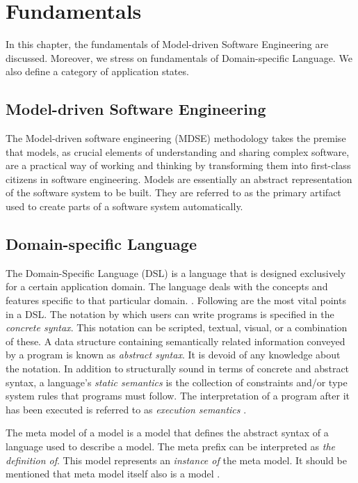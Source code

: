 \chapter{Fundamentals}
\label{ch:fundamentals}
In this chapter, the fundamentals of Model-driven Software Engineering are discussed. Moreover, we stress on fundamentals of Domain-specific Language. We also define a category of application states.

\section{Model-driven Software Engineering}
The Model-driven software engineering (MDSE) methodology takes the premise that models, as crucial elements of understanding and sharing complex software, are a practical way of working and thinking by transforming them into first-class citizens in software engineering\cite{mdse}. Models are essentially an abstract representation of the software system to be built. They are referred to as the primary artifact used to create parts of a software system automatically. \cite{mdse2011}

\section{Domain-specific Language}
The Domain-Specific Language (DSL) is a language that is designed exclusively for a certain application domain. The language deals with the concepts and features specific to that particular domain. \cite{dsl}.
Following are the most vital points in a DSL. The notation by which users can write programs is specified in the \textit{concrete syntax}. This notation can be scripted, textual, visual, or a combination of these. A data structure containing semantically related information conveyed by a program is known as \textit{abstract syntax}. It is devoid of any knowledge about the notation. In addition to structurally sound in terms of concrete and abstract syntax, a language's \textit{static semantics} is the collection of constraints and/or type system rules that programs must follow. The interpretation of a program after it has been executed is referred to as \textit{execution semantics} \cite{dsl-eng}.

The meta model of a model is a model that defines the abstract syntax of a language used to describe a model. The meta prefix can be interpreted as \textit{the definition of}. This model represents an \textit{instance of} the meta model. It should be mentioned that meta model itself also is a model \cite{dsl-eng}.



